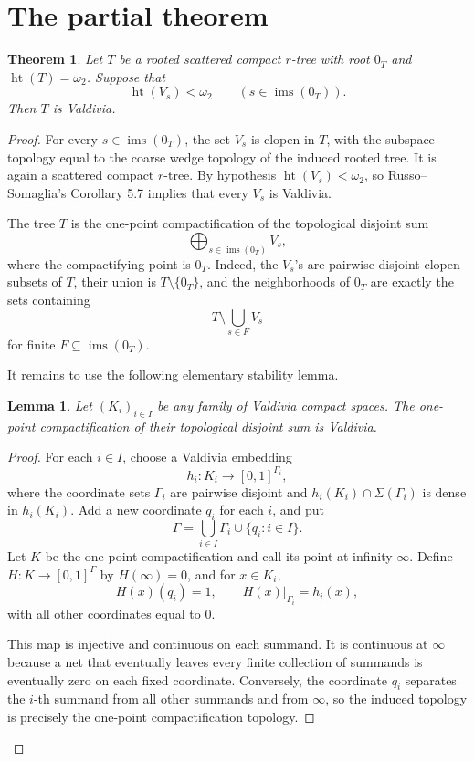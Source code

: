 \documentclass[11pt]{article}
\newtheorem{theorem}{Theorem}
\newtheorem{lemma}{Lemma}
\newcommand{\htte}{\operatorname{ht}}
\newcommand{\ims}{\operatorname{ims}}
\begin{document}
\section*{The partial theorem}

\begin{theorem}
Let \(T\) be a rooted scattered compact \(r\)-tree with root \(0_T\) and
\(\htte(T)=\omega_2\). Suppose that
\[
  \htte(V_s)<\omega_2 \qquad (s\in\ims(0_T)).
\]
Then \(T\) is Valdivia.
\end{theorem}

\begin{proof}
For every \(s\in\ims(0_T)\), the set \(V_s\) is clopen in \(T\), with the
subspace topology equal to the coarse wedge topology of the induced rooted
tree. It is again a scattered compact \(r\)-tree. By hypothesis
\(\htte(V_s)<\omega_2\), so Russo--Somaglia's Corollary 5.7
\cite{RussoSomaglia} implies that every \(V_s\) is Valdivia.

The tree \(T\) is the one-point compactification of the topological disjoint
sum
\[
  \bigoplus_{s\in\ims(0_T)} V_s,
\]
where the compactifying point is \(0_T\). Indeed, the \(V_s\)'s are pairwise
disjoint clopen subsets of \(T\), their union is \(T\setminus\{0_T\}\), and
the neighborhoods of \(0_T\) are exactly the sets containing
\[
  T\setminus \bigcup_{s\in F} V_s
\]
for finite \(F\subseteq\ims(0_T)\).

It remains to use the following elementary stability lemma.

\begin{lemma}
Let \((K_i)_{i\in I}\) be any family of Valdivia compact spaces. The
one-point compactification of their topological disjoint sum is Valdivia.
\end{lemma}

\begin{proof}
For each \(i\in I\), choose a Valdivia embedding
\[
  h_i:K_i\longrightarrow [0,1]^{\Gamma_i},
\]
where the coordinate sets \(\Gamma_i\) are pairwise disjoint and
\(h_i(K_i)\cap\Sigma(\Gamma_i)\) is dense in \(h_i(K_i)\). Add a new
coordinate \(q_i\) for each \(i\), and put
\[
  \Gamma=\bigcup_{i\in I}\Gamma_i\cup\{q_i:i\in I\}.
\]
Let \(K\) be the one-point compactification and call its point at infinity
\(\infty\). Define \(H:K\to[0,1]^\Gamma\) by \(H(\infty)=0\), and for
\(x\in K_i\),
\[
  H(x)(q_i)=1,\qquad H(x)|_{\Gamma_i}=h_i(x),
\]
with all other coordinates equal to \(0\).

This map is injective and continuous on each summand. It is continuous at
\(\infty\) because a net that eventually leaves every finite collection of
summands is eventually zero on each fixed coordinate. Conversely, the
coordinate \(q_i\) separates the \(i\)-th summand from all other summands and
from \(\infty\), so the induced topology is precisely the one-point
compactification topology.


\end{proof}
\end{proof}
\end{document}
